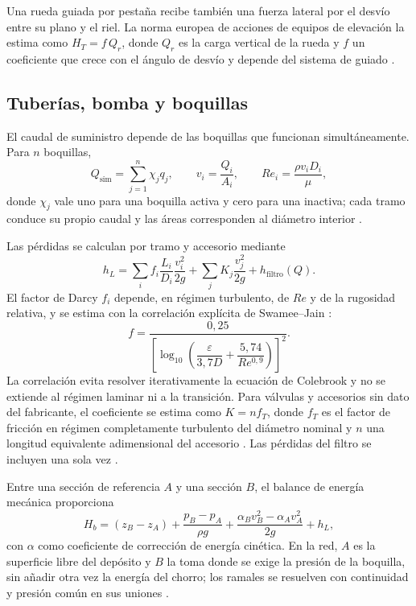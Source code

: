 Una rueda guiada por pestaña recibe también una fuerza lateral por el desvío entre su plano y el riel. La norma europea de acciones de equipos de elevación la estima como $H_T=f\,Q_r$, donde $Q_r$ es la carga vertical de la rueda y $f$ un coeficiente que crece con el ángulo de desvío y depende del sistema de guiado \cite{en19913}.

\subsection{Tuberías, bomba y boquillas}

El caudal de suministro depende de las boquillas que funcionan simultáneamente. Para $n$ boquillas,
\begin{equation}
  Q_{\mathrm{sim}}=\sum_{j=1}^{n}\chi_jq_j,\qquad
  v_i=\frac{Q_i}{A_i},\qquad Re_i=\frac{\rho v_iD_i}{\mu},
  \label{eq:mt-caudal-re}
\end{equation}
donde $\chi_j$ vale uno para una boquilla activa y cero para una inactiva; cada tramo conduce su propio caudal y las áreas corresponden al diámetro interior \cite{white2016}.

Las pérdidas se calculan por tramo y accesorio mediante
\begin{equation}
  h_L=\sum_i f_i\frac{L_i}{D_i}\frac{v_i^2}{2g}
  +\sum_j K_j\frac{v_j^2}{2g}+h_{\mathrm{filtro}}(Q).
  \label{eq:teo-perdidas}
\end{equation}
El factor de Darcy $f_i$ depende, en régimen turbulento, de $Re$ y de la rugosidad relativa, y se estima con la correlación explícita de Swamee--Jain \cite{manSwamee}:
\begin{equation}
  f=\frac{0{,}25}{\left[\log_{10}\left(\dfrac{\varepsilon}{3{,}7D}
    +\dfrac{5{,}74}{Re^{0{,}9}}\right)\right]^2}.
  \label{eq:mt-swamee-jain}
\end{equation}
La correlación evita resolver iterativamente la ecuación de Colebrook y no se extiende al régimen laminar ni a la transición. Para válvulas y accesorios sin dato del fabricante, el coeficiente se estima como $K=n f_T$, donde $f_T$ es el factor de fricción en régimen completamente turbulento del diámetro nominal y $n$ una longitud equivalente adimensional del accesorio \cite{crane410}. Las pérdidas del filtro se incluyen una sola vez \cite{white2016}.

Entre una sección de referencia $A$ y una sección $B$, el balance de energía mecánica proporciona
\begin{equation}
  H_b=(z_B-z_A)+\frac{p_B-p_A}{\rho g}
  +\frac{\alpha_Bv_B^2-\alpha_Av_A^2}{2g}+h_L,
  \label{eq:teo-energia}
\end{equation}
con $\alpha$ como coeficiente de corrección de energía cinética. En la red, $A$ es la superficie libre del depósito y $B$ la toma donde se exige la presión de la boquilla, sin añadir otra vez la energía del chorro; los ramales se resuelven con continuidad y presión común en sus uniones \cite{white2016}.

